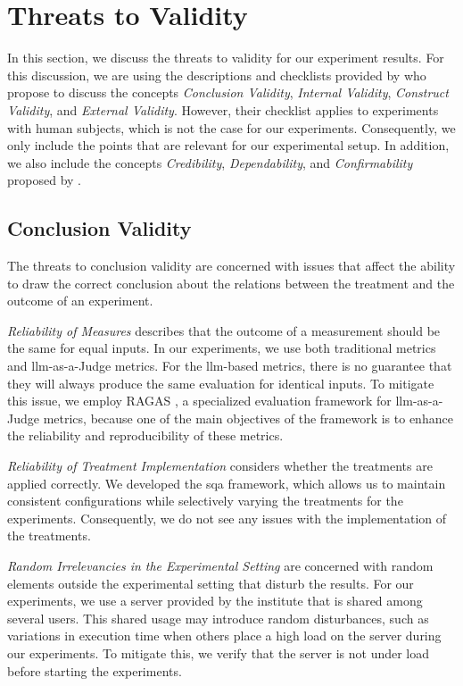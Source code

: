 

\section{Threats to Validity}
\label{sec:general_threats_to_validity}

In this section, we discuss the threats to validity for our experiment results. For this discussion, we are using the descriptions and checklists provided by \textcite[131-140]{wohlin_experimentation_2024} who propose to discuss the concepts \emph{Conclusion Validity}, \emph{Internal Validity}, \emph{Construct Validity}, and \emph{External Validity}. However, their checklist applies to experiments with human subjects, which is not the case for our experiments. Consequently, we only include the points that are relevant for our experimental setup. In addition, we also include the concepts \emph{Credibility}, \emph{Dependability}, and \emph{Confirmability} proposed by \textcite{feldt_validity_2010}.

\subsection{Conclusion Validity}

The threats to conclusion validity are concerned with issues that affect the ability to draw the correct conclusion about the relations between the treatment and the outcome of an experiment.

\emph{Reliability of Measures} describes that the outcome of a measurement should be the same for equal inputs. In our experiments, we use both traditional metrics and \gls{llm}-as-a-Judge metrics. For the \gls{llm}-based metrics, there is no guarantee that they will always produce the same evaluation for identical inputs. To mitigate this issue, we employ RAGAS \cite{es_ragas_2023}, a specialized evaluation framework for \gls{llm}-as-a-Judge metrics, because one of the main objectives of the framework is to enhance the reliability and reproducibility of these metrics.

\emph{Reliability of Treatment Implementation} considers whether the treatments are applied correctly. We developed the \gls{sqa} framework, which allows us to maintain consistent configurations while selectively varying the treatments for the experiments. Consequently, we do not see any issues with the implementation of the treatments.

\emph{Random Irrelevancies in the Experimental Setting} are concerned with random elements outside the experimental setting that disturb the results. For our experiments, we use a server provided by the institute that is shared among several users. This shared usage may introduce random disturbances, such as variations in execution time when others place a high load on the server during our experiments. To mitigate this, we verify that the server is not under load before starting the experiments.


